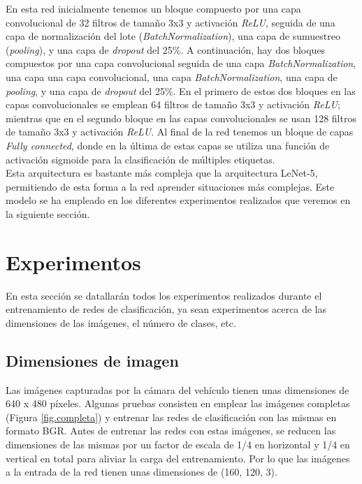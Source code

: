 En esta red inicialmente tenemos un bloque compuesto por una capa convolucional de 32 filtros de tamaño 3x3 y activación \textit{ReLU}, seguida de una capa de normalización del lote (\textit{BatchNormalization}), una capa de sumuestreo (\textit{pooling}), y una capa de \textit{dropout} del 25\%. A continuación, hay dos bloques compuestos por una capa convolucional seguida de una capa \textit{BatchNormalization}, una capa una capa convolucional, una capa \textit{BatchNormalization}, una capa de \textit{pooling}, y una capa de \textit{dropout} del 25\%. En el primero de estos dos bloques en las capas convolucionales se emplean 64 filtros de tamaño 3x3 y activación \textit{ReLU}; mientras que en el segundo bloque en las capas convolucionales se usan 128 filtros de tamaño 3x3 y activación \textit{ReLU}. Al final de la red tenemos un bloque de capas \textit{Fully connected}, donde en la última de estas capas se utiliza una función de activación sigmoide para la clasificación de múltiples etiquetas.\\


Esta arquitectura es bastante más compleja que la arquitectura LeNet-5, permitiendo de esta forma a la red aprender situaciones más complejas. Este modelo se ha empleado en los diferentes experimentos realizados que veremos en la siguiente sección.


\section{Experimentos}

En esta sección se datallarán todos los experimentos realizados durante el entrenamiento de redes de clasificación, ya sean experimentos acerca de las dimensiones de las imágenes, el número de clases, etc. \\


\subsection{Dimensiones de imagen}

Las imágenes capturadas por la cámara del vehículo tienen unas dimensiones de 640 x 480 píxeles. Algunas pruebas consisten en emplear las imágenes completas (Figura \ref{fig.completa}) y entrenar las redes de clasificación con las mismas en formato BGR. Antes de entrenar las redes con estas imágenes, se reducen las dimensiones de las mismas por un factor de escala de 1/4 en horizontal y 1/4 en vertical en total para aliviar la carga del entrenamiento. Por lo que las imágenes a la entrada de la red tienen unas dimensiones de (160, 120, 3).\\

